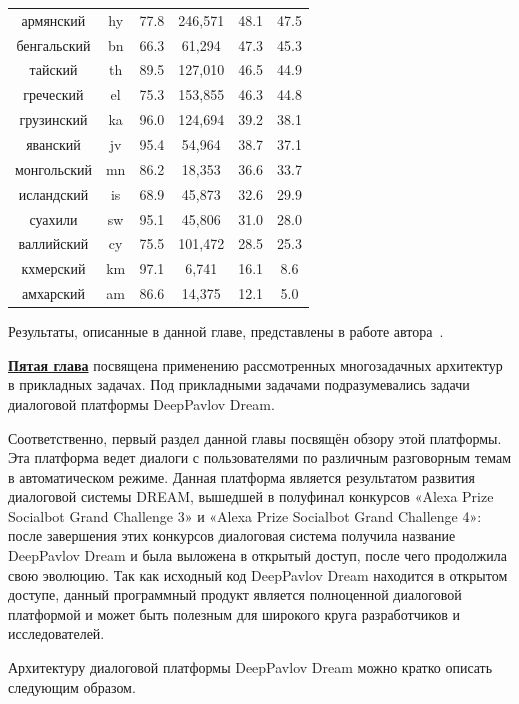 \begin{table}
{\begin{tabular}{|c|c|c||c|c|c|}
армянский & hy & 77.8 & 246,571 & 48.1 & 47.5\\
бенгальский & bn & 66.3 & 61,294 & 47.3 & 45.3\\
тайский & th & 89.5 & 127,010 & 46.5 & 44.9\\
греческий & el & 75.3 & 153,855 & 46.3 & 44.8\\
грузинский & ka & 96.0 & 124,694 & 39.2 & 38.1\\
яванский & jv & 95.4 & 54,964 & 38.7 & 37.1\\
монгольский & mn & 86.2 & 18,353 & 36.6 & 33.7\\
исландский & is & 68.9 & 45,873 & 32.6 & 29.9\\
суахили & sw & 95.1 & 45,806 & 31.0 & 28.0\\
валлийский & cy & 75.5 & 101,472 & 28.5 & 25.3\\
кхмерский & km & 97.1 & 6,741 & 16.1 & 8.6\\
амхарский & am & 86.6 & 14,375 & 12.1 & 5.0\\ \hline
\end{tabular}
}
\end{table}

Результаты, описанные в данной главе, представлены в работе автора~\cite{rutopics}.

\underline{\textbf{Пятая глава}} посвящена применению рассмотренных многозадачных архитектур в прикладных задачах. Под прикладными задачами подразумевались задачи диалоговой платформы DeepPavlov Dream.

Соответственно, первый раздел данной главы посвящён обзору этой платформы. Эта платформа ведет диалоги с пользователями по различным разговорным темам в автоматическом режиме. Данная платформа является результатом развития диалоговой системы DREAM, вышедшей в полуфинал конкурсов «Alexa Prize Socialbot Grand Challenge 3» и «Alexa Prize Socialbot Grand Challenge 4»: после завершения этих конкурсов диалоговая система получила название DeepPavlov Dream и была выложена в открытый доступ, после чего продолжила свою эволюцию. Так как исходный код DeepPavlov Dream находится в открытом доступе, данный программный продукт является полноценной диалоговой платформой и может быть полезным для широкого круга разработчиков и исследователей.

Архитектуру диалоговой платформы DeepPavlov Dream можно кратко описать следующим образом. %

